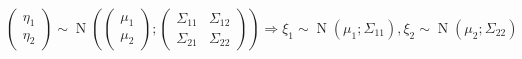 \documentclass{article}
\begin{document}
    \begin{claim}
        $$\left(\begin{matrix}
            \eta_1\\\eta_2
        \end{matrix}\right)\sim\operatorname{N}(\left(\begin{matrix}
            \mu_1\\\mu_2
        \end{matrix}\right);\left(\begin{matrix}
            \Sigma_{11} & \Sigma_{12}\\\Sigma_{21} & \Sigma_{22}
        \end{matrix}\right))
        \Rightarrow\xi_1\sim\operatorname{N}(\mu_1;\Sigma_{11}),\xi_2\sim\operatorname{N}(\mu_2;\Sigma_{22})
        $$
    \end{claim}
\end{document}

